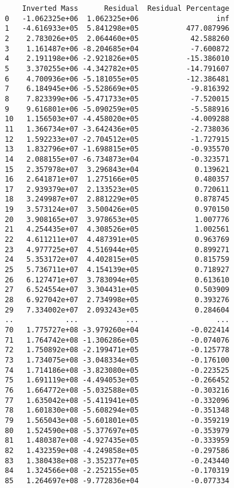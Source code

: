 \documentclass[11pt]{article}
\begin{document}
\begin{verbatim}
    Inverted Mass      Residual  Residual Percentage  
0   -1.062325e+06  1.062325e+06                  inf  
1   -4.616933e+05  5.841298e+05           477.087996  
2    2.783026e+05  2.064460e+05            42.588260  
3    1.161487e+06 -8.204685e+04            -7.600872  
4    2.191198e+06 -2.921826e+05           -15.386010  
5    3.370255e+06 -4.342782e+05           -14.791607  
6    4.700936e+06 -5.181055e+05           -12.386481  
7    6.184945e+06 -5.528669e+05            -9.816392  
8    7.823399e+06 -5.471733e+05            -7.520015  
9    9.616801e+06 -5.090259e+05            -5.588916  
10   1.156503e+07 -4.458020e+05            -4.009288  
11   1.366734e+07 -3.642436e+05            -2.738036  
12   1.592233e+07 -2.704512e+05            -1.727915  
13   1.832796e+07 -1.698815e+05            -0.935570  
14   2.088155e+07 -6.734873e+04            -0.323571  
15   2.357978e+07  3.296843e+04             0.139621  
16   2.641871e+07  1.275166e+05             0.480357  
17   2.939379e+07  2.133523e+05             0.720611  
18   3.249987e+07  2.881229e+05             0.878745  
19   3.573124e+07  3.500426e+05             0.970150  
20   3.908165e+07  3.978653e+05             1.007776  
21   4.254435e+07  4.308526e+05             1.002561  
22   4.611211e+07  4.487391e+05             0.963769  
23   4.977725e+07  4.516944e+05             0.899271  
24   5.353172e+07  4.402815e+05             0.815759  
25   5.736711e+07  4.154139e+05             0.718927  
26   6.127471e+07  3.783094e+05             0.613610  
27   6.524554e+07  3.304431e+05             0.503909  
28   6.927042e+07  2.734998e+05             0.393276  
29   7.334002e+07  2.093243e+05             0.284604  
..            ...           ...                  ...  
70   1.775727e+08 -3.979260e+04            -0.022414  
71   1.764742e+08 -1.306286e+05            -0.074076  
72   1.750892e+08 -2.199471e+05            -0.125778  
73   1.734075e+08 -3.048334e+05            -0.176100  
74   1.714186e+08 -3.823080e+05            -0.223525  
75   1.691119e+08 -4.494053e+05            -0.266452  
76   1.664772e+08 -5.032588e+05            -0.303216  
77   1.635042e+08 -5.411941e+05            -0.332096  
78   1.601830e+08 -5.608294e+05            -0.351348  
79   1.565043e+08 -5.601801e+05            -0.359219  
80   1.524590e+08 -5.377697e+05            -0.353979  
81   1.480387e+08 -4.927435e+05            -0.333959  
82   1.432359e+08 -4.249858e+05            -0.297586  
83   1.380438e+08 -3.352377e+05            -0.243440  
84   1.324566e+08 -2.252155e+05            -0.170319  
85   1.264697e+08 -9.772836e+04            -0.077334  

\end{verbatim}
\end{document}
